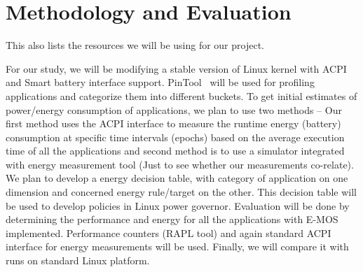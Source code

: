 \section{Methodology and Evaluation}\label{sec:meth}
	This also lists the resources we will be using for our project.

For our study, we will be modifying a stable version of Linux kernel with ACPI and Smart battery interface support. PinTool~\cite{pin} will be used for profiling applications and categorize them into different buckets. To get initial estimates of power/energy consumption of applications, we plan to use two methods -- Our first method uses the ACPI interface to measure the runtime energy (battery) consumption at specific time intervals (epochs) based on the average execution time of all the applications and second method is to use a simulator integrated with energy measurement tool (Just to see whether our measurements co-relate). 
We plan to develop a energy decision table, with category of application on one dimension and concerned energy rule/target on the other. This decision table will be used to develop policies in Linux power governor.  
Evaluation will be done by determining the performance and energy for all the applications with E-MOS implemented. Performance counters (RAPL tool) and again standard ACPI interface for energy measurements will be used.
Finally, we will compare it with runs on standard Linux platform. 

